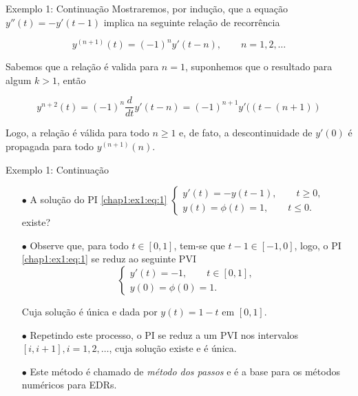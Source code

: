 \documentclass{beamer}
\theoremstyle{plain}
\theoremstyle{definition}
\begin{document}

\begin{frame}{Exemplo 1: Continuação}
        Mostraremos, por indução, que a equação $ y''(t) = - y'(t - 1)$ implica na seguinte relação de recorrência

        \begin{equation*}
            y^{(n+1)}(t) = (-1)^n y' (t-n), \qquad n = 1, 2, \dots
            \label{ex_intro1_eq2}
        \end{equation*} 

        Sabemos que a relação é valida para $n = 1$, suponhemos que o resultado para algum $k>1$, então 
    
        \[
            y^{n+2}(t) = (-1)^n \frac{d}{dt} y' (t-n) = (-1)^{n+1} y'((t-(n+1))
        \]

        Logo, a relação é válida para todo $n \geq 1$ e, de fato, a descontinuidade de $y'(0)$ é propagada para todo $y^{(n+1)}(n)$.

\end{frame}


\begin{frame}{Exemplo 1: Continuação}
        \begin{itemize}
            \item[$\bullet$] A solução do PI \eqref{chap1:ex1:eq:1}
                $
                \begin{cases}
                    y'(t) = -y(t - 1), \qquad t \geq 0, \\
                    y(t) = \phi(t) = 1, \qquad t \leq 0.
                \end{cases} 
                $
                existe?
            \item[$\bullet$] Observe que, para todo $t \in [0,1]$, tem-se que $t-1 \in [-1, 0]$, logo, o PI \eqref{chap1:ex1:eq:1} se reduz ao seguinte PVI
                \begin{equation*}
                    \begin{cases}
                        y'(t) = -1, \qquad t \in [0, 1], \\
                        y(0) = \phi(0) = 1.
                    \end{cases} 
                \end{equation*}

                Cuja solução é única e dada por $y(t) = 1 - t$ em $[0, 1]$. 
        
            \item[$\bullet$] Repetindo este processo, o PI se reduz a um PVI nos intervalos $[i, i+1], i = 1, 2, \dots$, cuja solução existe e é única. 
            \item[$\bullet$] Este método é chamado de \textit{método dos passos} e é a base para os métodos numéricos para EDRs.
        \end{itemize}


\end{frame}
\end{document}
